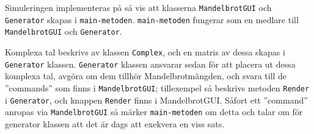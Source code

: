 \documentclass[a4paper]{article}
\begin{document}
\vspace{\baselineskip}
Simuleringen implementeras på så vis att klasserna \texttt{MandelbrotGUI} och \texttt{Generator} skapas i \texttt{main-metoden}.
\texttt{main-metoden} fungerar som en medlare till \texttt{MandelbrotGUI} och \texttt{Generator}.
 
Komplexa tal beskrivs av klassen \texttt{Complex}, och en matris av dessa skapas i \texttt{Generator} klassen. \texttt{Generator} klassen ansvarar sedan för att placera ut dessa komplexa tal, avgöra om dem tillhör Mandelbrotmängden, och svara till de ''commands'' som finns i \texttt{MandelbrotGUI}; tillexempel så beskrivs metoden \texttt{Render} i \texttt{Generator}, och knappen \texttt{Render} finns i MandelbrotGUI.
Såfort ett ''command'' anropas via \texttt{MandelbrotGUI} så märker \texttt{main-metoden} om detta och talar om för generator klassen att det är dags att exekvera en viss sats.
\end{document}

